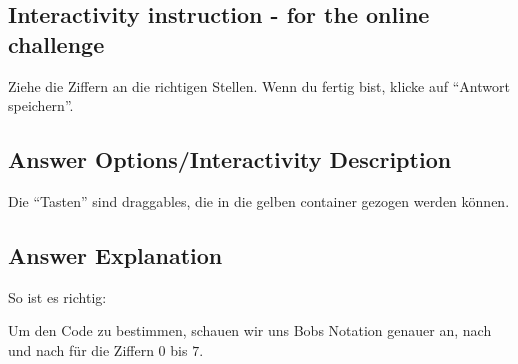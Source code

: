 \documentclass[a4paper,11pt]{report}
\newcommand{\taskGraphicsFolder}{..}
\begin{document}
\subsection*{Interactivity instruction - for the online challenge}

Ziehe die Ziffern an die richtigen Stellen. Wenn du fertig bist, klicke auf \enquote{Antwort speichern}.

\begingroup
\renewcommand{\arraystretch}{1.5}
\subsection*{Answer Options/Interactivity Description}

Die \enquote{Tasten} sind draggables, die in die gelben container gezogen werden können.

\endgroup

\subsection*{Answer Explanation}

So ist es richtig:

{\centering%
\par}

Um den Code zu bestimmen, schauen wir uns Bobs Notation genauer an, nach und nach für die Ziffern $0$ bis $7$.
\end{document}
